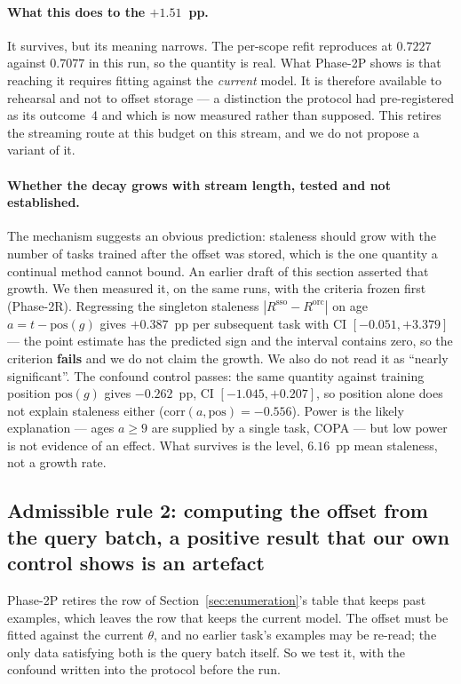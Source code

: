 \paragraph{What this does to the $+1.51$~pp.}
It survives, but its meaning narrows. The per-scope refit reproduces at $0.7227$
against $0.7077$ in this run, so the quantity is real. What Phase-2P shows is that
reaching it requires fitting against the \emph{current} model. It is therefore
available to rehearsal and not to offset storage --- a distinction the protocol
had pre-registered as its outcome~4 and which is now measured rather than
supposed. This retires the streaming route at this budget on this stream, and we
do not propose a variant of it.

\paragraph{Whether the decay grows with stream length, tested and not established.}
The mechanism suggests an obvious prediction: staleness should grow with the number
of tasks trained after the offset was stored, which is the one quantity a continual
method cannot bound. An earlier draft of this section asserted that growth. We then
measured it, on the same runs, with the criteria frozen first (Phase-2R). Regressing
the singleton staleness $|R^{\mathrm{sso}}-R^{\mathrm{orc}}|$ on age
$a=t-\mathrm{pos}(g)$ gives $\mathbf{+0.387}$~pp per subsequent task with CI
$[-0.051,+3.379]$ --- the point estimate has the predicted sign and the interval
contains zero, so the criterion \textbf{fails} and we do not claim the growth. We
also do not read it as ``nearly significant''. The confound control passes: the same
quantity against training position $\mathrm{pos}(g)$ gives $-0.262$~pp, CI
$[-1.045,+0.207]$, so position alone does not explain staleness either
($\mathrm{corr}(a,\mathrm{pos})=-0.556$). Power is the likely explanation --- ages
$a\ge9$ are supplied by a single task, COPA --- but low power is not evidence of an
effect. What survives is the level, $6.16$~pp mean staleness, not a growth rate.
\subsection{Admissible rule 2: computing the offset from the query batch, a positive
result that our own control shows is an artefact}
\label{sec:bpo}

Phase-2P retires the row of Section~\ref{sec:enumeration}'s table that keeps past
examples, which leaves the row that keeps the current model. The offset must be
fitted against the current $\theta$, and no earlier task's examples may be
re-read; the only data satisfying both is the query batch itself. So we test it,
with the confound written into the protocol before the run.

